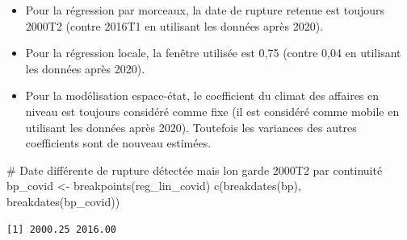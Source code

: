 \documentclass[
  a4paper,
  DIV=11,
  numbers=noendperiod,
  french]{scrartcl}
\newenvironment{Shaded}{\begin{snugshade}}{\end{snugshade}}
\newcommand{\AttributeTok}[1]{\textcolor[rgb]{0.40,0.45,0.13}{#1}}
\newcommand{\CommentTok}[1]{\textcolor[rgb]{0.37,0.37,0.37}{#1}}
\newcommand{\DecValTok}[1]{\textcolor[rgb]{0.68,0.00,0.00}{#1}}
\newcommand{\FunctionTok}[1]{\textcolor[rgb]{0.28,0.35,0.67}{#1}}
\newcommand{\NormalTok}[1]{\textcolor[rgb]{0.00,0.23,0.31}{#1}}
\newcommand{\OtherTok}[1]{\textcolor[rgb]{0.00,0.23,0.31}{#1}}
\newcommand{\SpecialCharTok}[1]{\textcolor[rgb]{0.37,0.37,0.37}{#1}}
\newcommand{\StringTok}[1]{\textcolor[rgb]{0.13,0.47,0.30}{#1}}
\providecommand{\tightlist}{%
  \setlength{\itemsep}{0pt}\setlength{\parskip}{0pt}}\usepackage{longtable,booktabs,array}
\newcommand\1{{\mathds 1}}
\theoremstyle{remark}
\begin{document}
\begin{itemize}
\tightlist
\item
  Pour la régression par morceaux, la date de rupture retenue est
  toujours 2000T2 (contre 2016T1 en utilisant les données après 2020).
\item
  Pour la régression locale, la fenêtre utilisée est 0,75 (contre 0,04
  en utilisant les données après 2020).
\item
  Pour la modélisation espace-état, le coefficient du climat des
  affaires en niveau est toujours considéré comme fixe (il est considéré
  comme mobile en utilisant les données après 2020). Toutefois les
  variances des autres coefficients sont de nouveau estimées.
\end{itemize}

\begin{Shaded}
\begin{Highlighting}[]
\CommentTok{\# Date différente de rupture détectée mais l\textquotesingle{}on garde 2000T2 par continuité}
\NormalTok{bp\_covid }\OtherTok{\textless{}{-}} \FunctionTok{breakpoints}\NormalTok{(reg\_lin\_covid)}
\FunctionTok{c}\NormalTok{(}\FunctionTok{breakdates}\NormalTok{(bp), }\FunctionTok{breakdates}\NormalTok{(bp\_covid))}
\end{Highlighting}
\end{Shaded}

\begin{verbatim}
[1] 2000.25 2016.00
\end{verbatim}

\begin{Shaded}
\end{Shaded}
\end{document}
